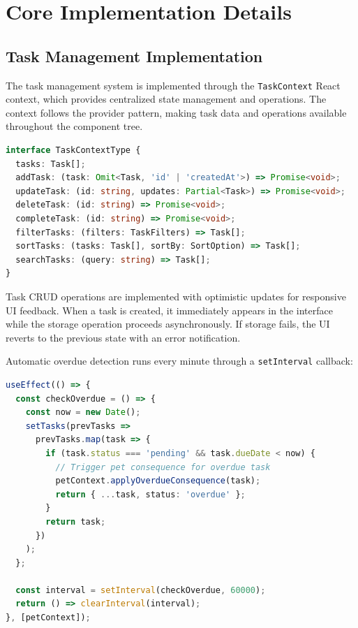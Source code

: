 \section{Core Implementation Details}
\label{sec:core-implementation}

\subsection{Task Management Implementation}

\completed

The task management system is implemented through the \texttt{TaskContext} React context, which provides centralized state management and operations. The context follows the provider pattern, making task data and operations available throughout the component tree.

\begin{lstlisting}[language=TypeScript, caption=TaskContext Interface]
interface TaskContextType {
  tasks: Task[];
  addTask: (task: Omit<Task, 'id' | 'createdAt'>) => Promise<void>;
  updateTask: (id: string, updates: Partial<Task>) => Promise<void>;
  deleteTask: (id: string) => Promise<void>;
  completeTask: (id: string) => Promise<void>;
  filterTasks: (filters: TaskFilters) => Task[];
  sortTasks: (tasks: Task[], sortBy: SortOption) => Task[];
  searchTasks: (query: string) => Task[];
}
\end{lstlisting}

Task CRUD operations are implemented with optimistic updates for responsive UI feedback. When a task is created, it immediately appears in the interface while the storage operation proceeds asynchronously. If storage fails, the UI reverts to the previous state with an error notification.

Automatic overdue detection runs every minute through a \texttt{setInterval} callback:

\begin{lstlisting}[language=TypeScript, caption=Overdue Detection Implementation]
useEffect(() => {
  const checkOverdue = () => {
    const now = new Date();
    setTasks(prevTasks => 
      prevTasks.map(task => {
        if (task.status === 'pending' && task.dueDate < now) {
          // Trigger pet consequence for overdue task
          petContext.applyOverdueConsequence(task);
          return { ...task, status: 'overdue' };
        }
        return task;
      })
    );
  };
  
  const interval = setInterval(checkOverdue, 60000);
  return () => clearInterval(interval);
}, [petContext]);
\end{lstlisting}

